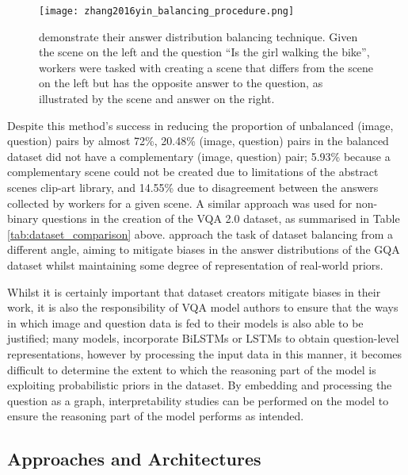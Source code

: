 \begin{figure}[H]
    \centering
    \texttt{[image: zhang2016yin\_balancing\_procedure.png]}
    \caption{\citeauthor{zhang2016yin} demonstrate their answer distribution balancing technique. Given the scene on the left and the question ``Is the girl walking the bike'', workers were tasked with creating a scene that differs from the scene on the left but has the opposite answer to the question, as illustrated by the scene and answer on the right.}
    \label{fig:zhang2016yin_balancing_procedure}
\end{figure}

Despite this method's success in reducing the proportion of unbalanced (image, question) pairs by almost 72\%, 20.48\% (image, question) pairs in the balanced dataset did not have a complementary (image, question) pair; 5.93\% because a complementary scene could not be created due to limitations of the abstract scenes clip-art library, and 14.55\% due to disagreement between the answers collected by workers for a given scene. A similar approach was used for non-binary questions in the creation of the VQA 2.0 dataset, as summarised in Table \ref{tab:dataset_comparison} above. \citeauthor{hudson2019gqa} approach the task of dataset balancing from a different angle, aiming to mitigate biases in the answer distributions of the GQA dataset whilst maintaining some degree of representation of real-world priors.

\vspace{\baselineskip}

Whilst it is certainly important that dataset creators mitigate biases in their work, it is also the responsibility of VQA model authors to ensure that the ways in which image and question data is fed to their models is also able to be justified; many models,  incorporate BiLSTMs \cite{hudson2018compositional} or LSTMs \cite{andreas2016neural} to obtain question-level representations, however by processing the input data in this manner, it becomes difficult to determine the extent to which the reasoning part of the model is exploiting probabilistic priors in the dataset. By embedding and processing the question as a graph, interpretability studies can be performed on the model to ensure the reasoning part of the model performs as intended.

\subsection*{Approaches and Architectures}


